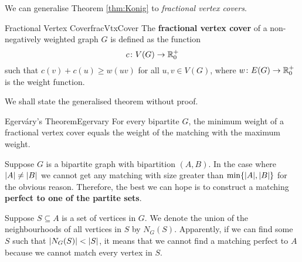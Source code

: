 \documentclass[math, code]{amznotes}
\theoremstyle{remark}
\begin{document}
We can generalise Theorem \ref{thm:Konig} to \textit{fractional vertex covers}.
\begin{dfnbox}{Fractional Vertex Cover}{fracVtxCover}
    The {\color{red} \textbf{fractional vertex cover}} of a non-negatively weighted graph $G$ is defined as the function
    \begin{equation*}
        c \colon V(G) \to \mathbb{R}^+_0
    \end{equation*}
    such that $c(v) + c(u) \geq w(uv)$ for all $u, v \in V(G)$, where $w \colon E(G) \to \mathbb{R}^+_0$ is the weight function.
\end{dfnbox}
We shall state the generalised theorem without proof.
\begin{thmbox}{Egerv\'{a}ry's Theorem}{Egervary}
    For every bipartite $G$, the minimum weight of a fractional vertex cover equals the weight of the matching with the maximum weight.
\end{thmbox}
Suppose $G$ is a bipartite graph with bipartition $(A, B)$. In the case where ${\left\lvert {A} \right\rvert} \neq {\left\lvert {B} \right\rvert}$ we cannot get any matching with size greater than $\min\{{\left\lvert {A} \right\rvert}, {\left\lvert {B} \right\rvert}\}$ for the obvious reason. Therefore, the best we can hope is to construct a matching \textbf{perfect to one of the partite sets}.

Suppose $S \subseteq A$ is a set of vertices in $G$. We denote the union of the neighbourhoods of all vertices in $S$ by $N_G(S)$. Apparently, if we can find some $S$ such that ${\left\lvert {N_G(S)} \right\rvert} < {\left\lvert {S} \right\rvert}$, it means that we cannot find a matching perfect to $A$ because we cannot match every vertex in $S$.
\end{document}
